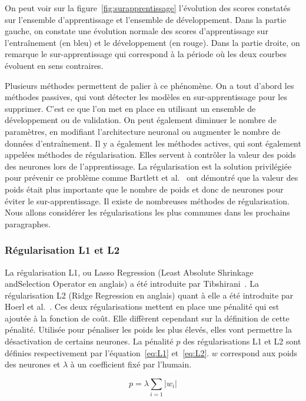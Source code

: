 On peut voir sur la figure~\ref{fig:surapprentissage} l'évolution des scores constatés sur l'ensemble d'apprentissage et l'ensemble de développement. Dans la partie gauche, on constate une évolution normale des scores d'apprentissage sur l’entraînement (en bleu) et le développement (en rouge). Dans la partie droite, on remarque le sur-apprentissage qui correspond à la période où les deux courbes évoluent en sens contraires.

Plusieurs méthodes permettent de palier à ce phénomène. On a tout d'abord les méthodes passives, qui vont détecter les modèles en sur-apprentissage pour les supprimer. C'est ce que l'on met en place en utilisant un ensemble de développement ou de validation. On peut également diminuer le nombre de paramètres, en modifiant l'architecture neuronal ou augmenter le nombre de données d’entraînement. Il y a également les méthodes actives, qui sont également appelées méthodes de régularisation. Elles servent à contrôler la valeur des poids des neurones lors de l'apprentissage. La régularisation est la solution privilégiée pour prévenir ce problème comme Bartlett et al.~\cite{Bartlett1997} ont démontré que la valeur des poids était plus importante que le nombre de poids et donc de neurones pour éviter le sur-apprentissage. Il existe de nombreuses méthodes de régularisation. Nous allons considérer les régularisations les plus communes dans les prochains paragraphes.

\subsubsection{Régularisation L1 et L2}

La régularisation L1, ou Lasso Regression (Least Absolute Shrinkage andSelection Operator en anglais) a été introduite par Tibshirani~\cite{Tibshirani1996}. La régularisation L2 (Ridge Regression en anglais) quant à elle a été introduite par Hoerl et al.~\cite{Hoerl1970}. Ces deux régularisations mettent en place une pénalité qui est ajoutée à la fonction de coût. Elle diffèrent cependant sur la définition de cette pénalité. Utilisée pour pénaliser les poids les plus élevés, elles vont permettre la désactivation de certains neurones. La pénalité $p$ des régularisations L1 et L2 sont définies respectivement par l'équation~\ref{eq:L1} et~\ref{eq:L2}. $w$ correspond aux poids des neurones et $\lambda$ à un coefficient fixé par l'humain.

\begin{equation}
  p = \lambda\sum_{i=1}|w_i|
  \label{eq:L1}
\end{equation}

